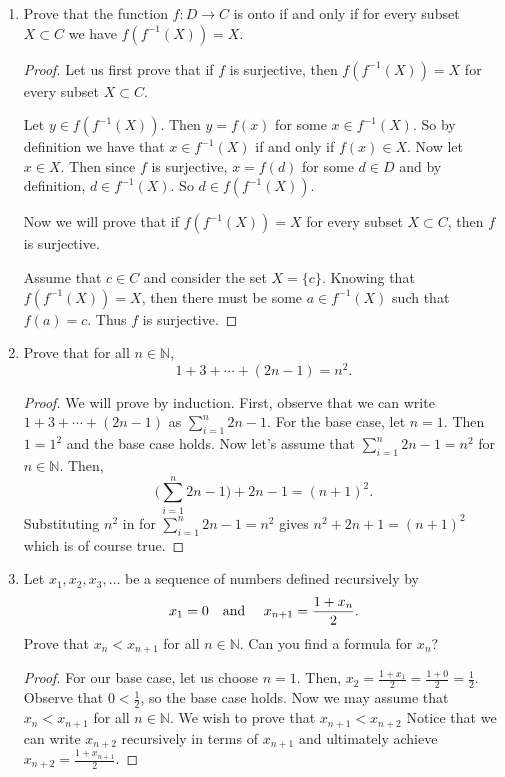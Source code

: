 \documentclass{article}
\begin{document}
\begin{enumerate}
        \item Prove that the function $f : D \to C$ is onto if and only if for every subset $X \subset C$ we have $f(f^{-1}(X)) = X$.
            
            \begin{proof}
                Let us first prove that if $f$ is surjective, then $f(f^{-1}(X)) = X$ for every subset $X \subset C$. 
                
                Let $y \in f(f^{-1}(X))$. Then $y = f(x)$ for some $x \in f^{-1}(X)$. So by definition we have that $x \in f^{-1}(X)$ if and only if $f(x) \in X$.
                Now let $x \in X$. Then since $f$ is surjective, $x = f(d)$ for some $d\in D$ and by definition, $d \in f^{-1}(X)$. So $d \in f(f^{-1}(X))$.\newline
                
                Now we will prove that if $f(f^{-1}(X)) = X$ for every subset $X \subset C$, then $f$ is surjective.
                
                Assume that $c \in C$ and consider the set $X = \{c\}$. Knowing that $f(f^{-1}(X)) = X$,  then there must be some $a \in f^{-1}(X)$ such that $f(a) = c$. Thus $f$ is surjective.
                
            \end{proof}
            
        \item Prove that for all $n \in \mathbb{N}$,
            \[1+3+\cdots+(2n - 1) = n^2.\]
            \begin{proof}
                We will prove by induction. First, observe that we can write $1+3+ \cdots +(2n-1)$ as $\sum_{i=1} ^n 2n-1$. For the base case, let $n = 1$. Then $1 = 1^2$ and the base case holds. Now let's assume that $\sum_{i=1} ^n 2n-1 = n^2$ for $n \in \mathbb{N}$. Then,
                    \[\Bigg(\sum_{i=1} ^n 2n - 1 \Bigg) + 2n - 1 = (n+1)^2.\]
                Substituting $n^2$ in for $\sum_{i=1} ^n 2n-1 = n^2$ gives $n^2+2n+1 = (n+1)^2$ which is of course true.
                
            \end{proof}
            
        \item Let $x_1, x_2, x_3, \ldots$ be a sequence of numbers defined recursively by
            \[x_1 = 0\text{\quad and \quad}x_{n+1} = \frac{1+x_n}{2}.\]
        Prove that $x_n < x_{n+1}$ for all $n \in \mathbb{N}$. Can you find a formula for $x_n$?
            \begin{proof}
               For our base case, let us choose $n = 1$. Then, $x_2 = \frac{1+x_1}{2} = \frac{1+0}{2} = \frac{1}{2}$. Observe that $0 < \frac{1}{2}$, so the base case holds. Now we may assume that $x_n < x_{n+1}$ for all $n \in \mathbb{N}$. We wish to prove that $x_{n+1} < x_{n+2}$ Notice that we can write $x_{n+2}$ recursively in terms of $x_{n+1}$ and ultimately achieve $x_{n+2} = \frac{1+x_{n+1}}{2}$.
                

\end{proof}
\end{enumerate}
\end{document}
